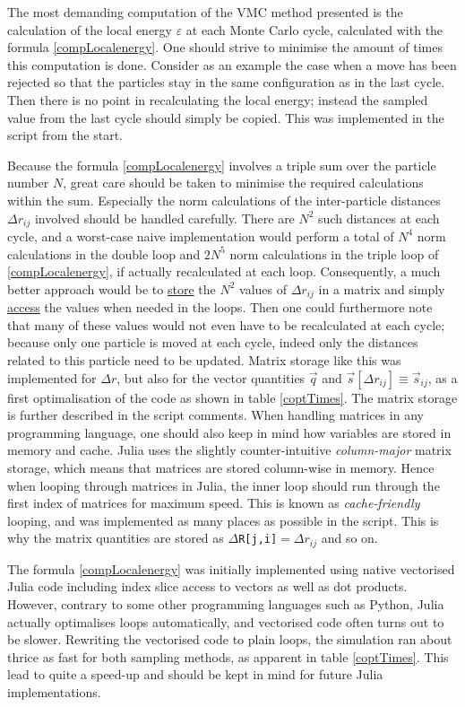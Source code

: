 \documentclass[a4paper,8pt]{article}
\begin{document}
\begin{multicols}{2}
The most demanding computation of the VMC method presented is the calculation of the local energy $\varepsilon$ at each Monte Carlo cycle, calculated with the formula \eqref{compLocalenergy}. One should strive to minimise the amount of times this computation is done. Consider as an example the case when a move has been rejected so that the particles stay in the same configuration as in the last cycle. Then there is no point in recalculating the local energy; instead the sampled value from the last cycle should simply be copied. This was implemented in the script from the start. 

Because the formula \eqref{compLocalenergy} involves a triple sum over the particle number $N$, great care should be taken to minimise the required calculations within the sum. Especially the norm calculations of the inter-particle distances $\Delta r_{ij}$ involved should be handled carefully. There are $N^2$ such distances at each cycle, and a worst-case naive implementation would perform a total of $N^4$ norm calculations in the double loop and $2N^5$ norm calculations in the triple loop of \eqref{compLocalenergy}, if actually recalculated at each loop. Consequently, a much better approach would be to \underline{store} the $N^2$ values of $\Delta r_{ij}$ in a matrix and simply \underline{access} the values when needed in the loops. Then one could furthermore note that many of these values would not even have to be recalculated at each cycle; because only one particle is moved at each cycle, indeed only the distances related to this particle need to be updated. Matrix storage like this was implemented for $\Delta r$, but also for the vector quantities $\vec{q}$ and $\vec{s}[\Delta r_{ij}] \equiv \vec{s}_{ij}$, as a first optimalisation of the code as shown in table \ref{coptTimes}. The matrix storage is further described in the script comments. When handling matrices in any programming language, one should also keep in mind how variables are stored in memory and cache. Julia uses the slightly counter-intuitive \textit{column-major} matrix storage, which means that matrices are stored column-wise in memory. Hence when looping through matrices in Julia, the inner loop should run through the first index of matrices for maximum speed. This is known as \textit{cache-friendly} looping, and was implemented as many places as possible in the script. This is why the matrix quantities are stored as \texttt{$\Delta$R[j,i]}$ = \Delta{r}_{ij}$ and so on.

The formula \eqref{compLocalenergy} was initially implemented using native vectorised Julia code including index slice access to vectors as well as dot products. However, contrary to some other programming languages such as Python, Julia actually optimalises loops automatically, and vectorised code often turns out to be slower. Rewriting the vectorised code to plain loops, the simulation ran about thrice as fast for both sampling methods, as apparent in table \ref{coptTimes}. This lead to quite a speed-up and should be kept in mind for future Julia implementations.


\end{multicols}
\end{document}
